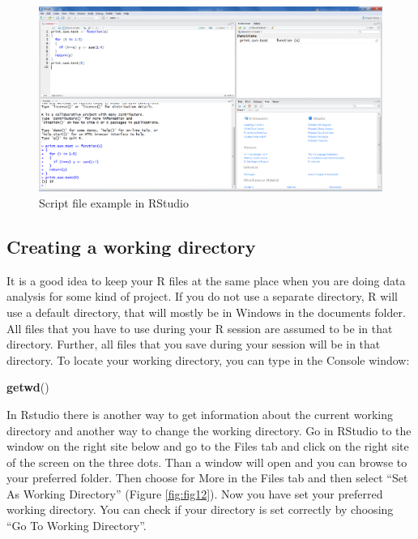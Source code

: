 \documentclass[]{book}
\newenvironment{Shaded}{\begin{snugshade}}{\end{snugshade}}
\newcommand{\KeywordTok}[1]{\textcolor[rgb]{0.13,0.29,0.53}{\textbf{#1}}}
\newcommand{\NormalTok}[1]{#1}
\theoremstyle{definition}
\theoremstyle{definition}
\theoremstyle{definition}
\theoremstyle{remark}
\begin{document}
\begin{figure}

{\centering \includegraphics[width=0.9\linewidth]{images/fig1.11} 

}

\caption{Script file example in RStudio}\label{fig:fig11}
\end{figure}

\subsection{Creating a working
directory}\label{creating-a-working-directory}

It is a good idea to keep your R files at the same place when you are
doing data analysis for some kind of project. If you do not use a
separate directory, R will use a default directory, that will mostly be
in Windows in the documents folder. All files that you have to use
during your R session are assumed to be in that directory. Further, all
files that you save during your session will be in that directory. To
locate your working directory, you can type in the Console window:

\begin{Shaded}
\begin{Highlighting}[]
\KeywordTok{getwd}\NormalTok{()}
\end{Highlighting}
\end{Shaded}

In Rstudio there is another way to get information about the current
working directory and another way to change the working directory. Go in
RStudio to the window on the right site below and go to the Files tab
and click on the right site of the screen on the three dots. Than a
window will open and you can browse to your preferred folder. Then
choose for More in the Files tab and then select ``Set As Working
Directory'' (Figure \ref{fig:fig12}). Now you have set your preferred
working directory. You can check if your directory is set correctly by
choosing ``Go To Working Directory''.
\end{document}
